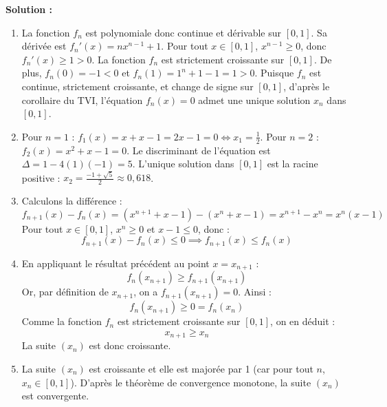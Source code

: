 \textbf{Solution :}
\begin{enumerate}
    \item La fonction $f_n$ est polynomiale donc continue et dérivable sur $[0, 1]$.
    Sa dérivée est $f_n'(x) = n x^{n-1} + 1$.
    Pour tout $x \in [0, 1]$, $x^{n-1} \ge 0$, donc $f_n'(x) \ge 1 > 0$.
    La fonction $f_n$ est strictement croissante sur $[0, 1]$.
    De plus, $f_n(0) = -1 < 0$ et $f_n(1) = 1^n + 1 - 1 = 1 > 0$.
    Puisque $f_n$ est continue, strictement croissante, et change de signe sur $[0,1]$, d'après le corollaire du TVI, l'équation $f_n(x) = 0$ admet une unique solution $x_n$ dans $[0, 1]$.
    
    \item Pour $n = 1$ : $f_1(x) = x + x - 1 = 2x - 1 = 0 \iff x_1 = \frac{1}{2}$.
    Pour $n = 2$ : $f_2(x) = x^2 + x - 1 = 0$. Le discriminant de l'équation est $\Delta = 1 - 4(1)(-1) = 5$.
    L'unique solution dans $[0, 1]$ est la racine positive : $x_2 = \frac{-1+\sqrt{5}}{2} \approx 0,618$.
    
    \item Calculons la différence :
    \[
    f_{n+1}(x) - f_n(x) = (x^{n+1} + x - 1) - (x^n + x - 1) = x^{n+1} - x^n = x^n(x - 1)
    \]
    Pour tout $x \in [0, 1]$, $x^n \ge 0$ et $x-1 \le 0$, donc :
    \[
    f_{n+1}(x) - f_n(x) \le 0 \implies f_{n+1}(x) \le f_n(x)
    \]
    
    \item En appliquant le résultat précédent au point $x = x_{n+1}$ :
    \[
    f_n(x_{n+1}) \ge f_{n+1}(x_{n+1})
    \]
    Or, par définition de $x_{n+1}$, on a $f_{n+1}(x_{n+1}) = 0$. Ainsi :
    \[
    f_n(x_{n+1}) \ge 0 = f_n(x_n)
    \]
    Comme la fonction $f_n$ est strictement croissante sur $[0, 1]$, on en déduit :
    \[
    x_{n+1} \ge x_n
    \]
    La suite $(x_n)$ est donc croissante.
    
    \item La suite $(x_n)$ est croissante et elle est majorée par 1 (car pour tout $n$, $x_n \in [0, 1]$).
    D'après le théorème de convergence monotone, la suite $(x_n)$ est convergente.
\end{enumerate}

